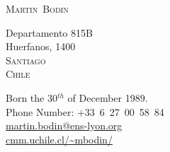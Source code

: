 \documentclass[12pt,a4paper]{article}
\begin{document}
\pagestyle{empty}


\newlength{\annee}
\settowidth{\annee}{9999—9999} %


\newlength{\texte}
\setlength{\texte}{\textwidth} \addtolength{\texte}{-\annee} 
	\addtolength{\texte}{-2\tabcolsep}

\begin{center} \Huge \textsc{Martin~Bodin} \end{center}

\parbox{0.5\textwidth}
{
  \noindent
  Departamento 815B \\
  Huerfanos, 1400 \\
  \textsc{Santiago} \\
  \textsc{Chile}
}
\parbox{.55\textwidth}
{
\begin{flushright}
  Born the 30\(^{th}\) of December 1989. \\
  \noindent Phone Number: \mbox{+33 6 27 00 58 84} \\
  \url{martin.bodin@ens-lyon.org} \\
  \url{cmm.uchile.cl/~mbodin/}
\end{flushright}
}
\end{document}
